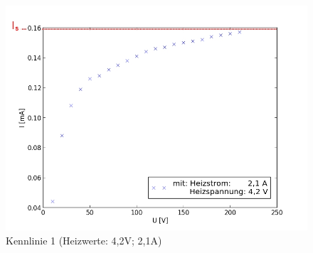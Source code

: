 	\begin{figure}[h]
		\begin{center}
		\includegraphics[scale=0.75]{pica1.jpg}
		\caption{Kennlinie 1 (Heizwerte: 4,2V; 2,1A)}
		\label{pica1}
		\end{center}	
	\end{figure}